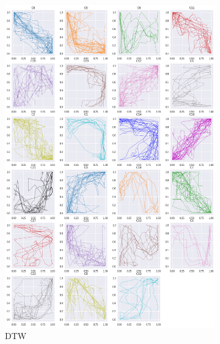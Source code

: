 \begin{figure}[h]
  \centering
  \begin{subfigure}[c]{0.3\linewidth}
    \includegraphics[width=\linewidth]{figs/clusters/CLU_AP_ALL[DTW].png}
    \caption{DTW}
  \end{subfigure}
  \hspace{.5em}
   \begin{subfigure}[c]{0.3\linewidth}

\end{subfigure}
\end{figure}
